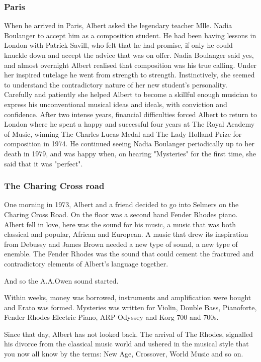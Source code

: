 \documentclass{article}
\begin{document}
\subsubsection{Paris}

When he arrived in Paris, Albert asked the legendary teacher Mlle. Nadia Boulanger to accept him as a composition student.
He had been having lessons in London with Patrick Savill, who felt that he had promise, if only he could knuckle down and accept the advice that was on offer.
Nadia Boulanger said yes, and almost overnight Albert realised that composition was his true calling.
Under her inspired tutelage he went from strength to strength.
Instinctively, she seemed to understand the contradictory nature of her new student's personality.
Carefully and patiently she helped Albert to become a skillful enough musician to express his unconventional musical ideas and ideals, with conviction and confidence.
After two intense years, financial difficulties forced Albert to return to London where he spent a happy and successful four years at The Royal Academy of Music, winning The Charles Lucas Medal and The Lady Holland Prize for composition in 1974.
He continued seeing Nadia Boulanger periodically up to her death in 1979, and was happy when, on hearing "Mysteries" for the first time, she said that it was "perfect".

\subsubsection{The Charing Cross road}

One morning in 1973, Albert and a friend decided to go into Selmers on the Charing Cross Road.
On the floor was a second hand Fender Rhodes piano.
Albert fell in love, here was the sound for his music, a music that was both classical and popular, African and European.
A music that drew its inspiration from Debussy and James Brown needed a new type of sound, a new type of enemble.
The Fender Rhodes was the sound that could cement the fractured and contradictory elements of Albert's language together.

And so the A.A.Owen sound started.

Within weeks, money was borrowed, instruments and amplification were bought and Erato was formed.
Mysteries was written for Violin, Double Bass, Pianoforte, Fender Rhodes Electric Piano, ARP Odyssey and Korg 700 and 700s.

Since that day, Albert has not looked back.
The arrival of The Rhodes, signalled his divorce from the classical music world and ushered in the musical style that you now all know by the terms: New Age, Crossover, World Music and so on.
\end{document}
